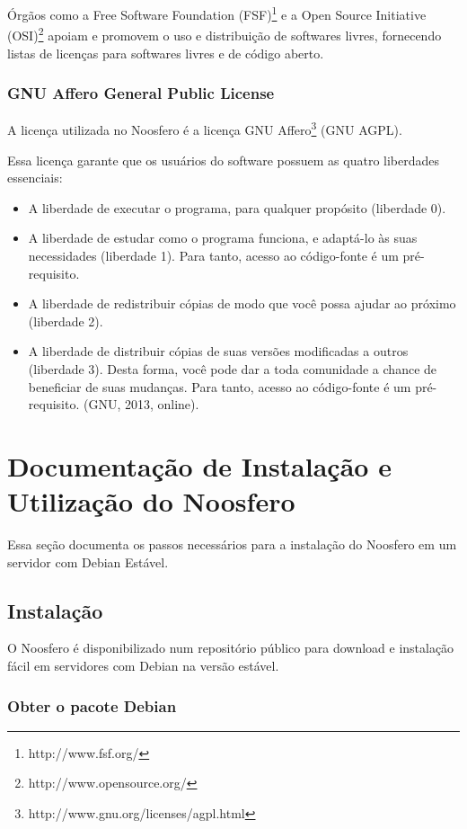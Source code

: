 \documentclass[[a4paper,11pt]{article}
\begin{document}
Órgãos como a Free Software Foundation
(FSF)\footnote{http://www.fsf.org/} e a Open Source
Initiative (OSI)\footnote{http://www.opensource.org/} apoiam e
promovem o uso e distribuição de softwares livres, fornecendo listas de
licenças para softwares livres e de código aberto.

\subsubsection{GNU Affero General Public License}

A licença utilizada no Noosfero é a licença GNU
Affero\footnote{http://www.gnu.org/licenses/agpl.html} (GNU AGPL).

Essa licença garante que os usuários do software possuem as quatro
liberdades essenciais:

\begin{itemize}
  \item A liberdade de executar o programa, para qualquer propósito (liberdade 0).
  \item A liberdade de estudar como o programa funciona, e adaptá-lo às
suas necessidades (liberdade 1). Para tanto, acesso ao código-fonte é um
pré-requisito.
  \item A liberdade de redistribuir cópias de modo que você possa ajudar
ao próximo (liberdade 2).
  \item A liberdade de distribuir cópias de suas versões modificadas a
outros (liberdade 3). Desta forma, você pode dar a toda comunidade a
chance de beneficiar de suas mudanças. Para tanto, acesso ao
código-fonte é um pré-requisito. (GNU, 2013, online).
\end{itemize}

\section{Documentação de Instalação e Utilização do Noosfero}

Essa seção documenta os passos necessários para a instalação do
Noosfero em um servidor com Debian Estável.

\subsection{Instalação}

O Noosfero é disponibilizado num repositório público para download e
instalação fácil em servidores com Debian na versão estável.

\subsubsection{Obter o pacote Debian}
\end{document}
